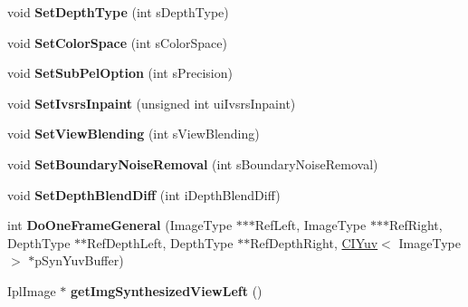 \begin{DoxyCompactItemize}
void {\bfseries Set\+Depth\+Type} (int s\+Depth\+Type)
\item 
\mbox{\label{class_c_view_interpolation_general_a8b3585813c303a973de342e07ffadd05}} 
void {\bfseries Set\+Color\+Space} (int s\+Color\+Space)
\item 
\mbox{\label{class_c_view_interpolation_general_ad2ae87df1c62275cc3b269f5be78d1fb}} 
void {\bfseries Set\+Sub\+Pel\+Option} (int s\+Precision)
\item 
\mbox{\label{class_c_view_interpolation_general_a7b9f60408151d3c821481fe62c012f23}} 
void {\bfseries Set\+Ivsrs\+Inpaint} (unsigned int ui\+Ivsrs\+Inpaint)
\item 
\mbox{\label{class_c_view_interpolation_general_a140e7e2255db05f3ed99e1255377d7a9}} 
void {\bfseries Set\+View\+Blending} (int s\+View\+Blending)
\item 
\mbox{\label{class_c_view_interpolation_general_afd1e7cb52d0fb2bb1e9e4d571ee238e2}} 
void {\bfseries Set\+Boundary\+Noise\+Removal} (int s\+Boundary\+Noise\+Removal)
\item 
\mbox{\label{class_c_view_interpolation_general_a89cad48e51b806f48dcca759094966ec}} 
void {\bfseries Set\+Depth\+Blend\+Diff} (int i\+Depth\+Blend\+Diff)
\item 
\mbox{\label{class_c_view_interpolation_general_a33b7fe7a385b198efe6ba3ce3b97d731}} 
int {\bfseries Do\+One\+Frame\+General} (Image\+Type $\ast$$\ast$$\ast$Ref\+Left, Image\+Type $\ast$$\ast$$\ast$Ref\+Right, Depth\+Type $\ast$$\ast$Ref\+Depth\+Left, Depth\+Type $\ast$$\ast$Ref\+Depth\+Right, \hyperlink{class_c_i_yuv}{C\+I\+Yuv}$<$ Image\+Type $>$ $\ast$p\+Syn\+Yuv\+Buffer)
\item 
\mbox{\label{class_c_view_interpolation_general_a540e0ca6231721e5f5aa8aa2a034b6a4}} 
Ipl\+Image $\ast$ {\bfseries get\+Img\+Synthesized\+View\+Left} ()
\item 
\mbox{\label{class_c_view_interpolation_general_abb1e1fa00e223210a683a0a1642478cd}} 

\end{DoxyCompactItemize}
